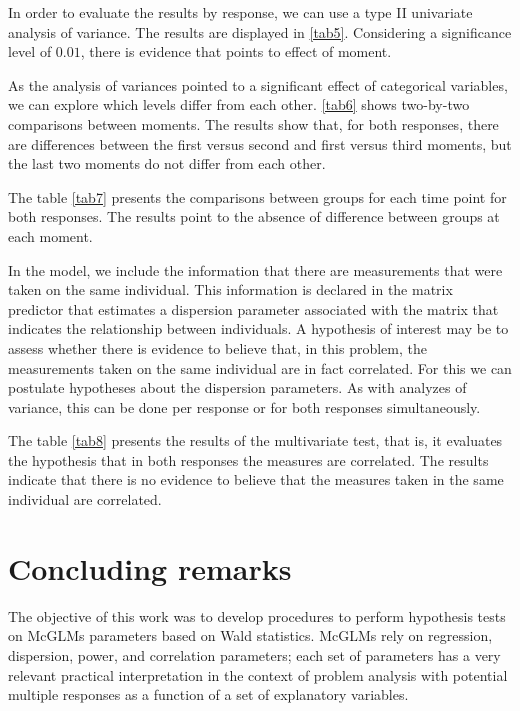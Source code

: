 \documentclass[AMA,STIX1COL]{WileyNJD-v2}
\begin{document}
In order to evaluate the results by response, we can use a type II univariate analysis of variance. The results are displayed in \autoref{tab5}. Considering a significance level of $0.01$, there is evidence that points to effect of moment.

As the analysis of variances pointed to a significant effect of categorical variables, we can explore which levels differ from each other. \autoref{tab6} shows two-by-two comparisons between moments. The results show that, for both responses, there are differences between the first versus second and first versus third moments, but the last two moments do not differ from each other.

The table \autoref{tab7} presents the comparisons between groups for each time point for both responses. The results point to the absence of difference between groups at each moment.

In the model, we include the information that there are measurements that were taken on the same individual. This information is declared in the matrix predictor that estimates a dispersion parameter associated with the matrix that indicates the relationship between individuals. A hypothesis of interest may be to assess whether there is evidence to believe that, in this problem, the measurements taken on the same individual are in fact correlated. For this we can postulate hypotheses about the dispersion parameters. As with analyzes of variance, this can be done per response or for both responses simultaneously.

The table \autoref{tab8} presents the results of the multivariate test, that is, it evaluates the hypothesis that in both responses the measures are correlated. The results indicate that there is no evidence to believe that the measures taken in the same individual are correlated.


\section{Concluding remarks}\label{sec7}

The objective of this work was to develop procedures to perform hypothesis tests on McGLMs parameters based on Wald statistics. McGLMs rely on regression, dispersion, power, and correlation parameters; each set of parameters has a very relevant practical interpretation in the context of problem analysis with potential multiple responses as a function of a set of explanatory variables.
\end{document}
